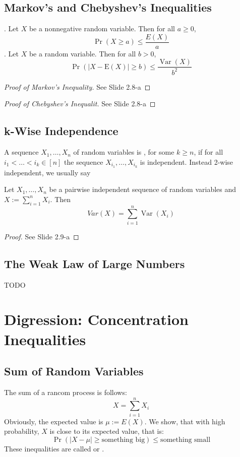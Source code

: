 \subsection{Markov's and Chebyshev's Inequalities}
. Let $X$ be a nonnegative random variable. Then for all $a \geq 0$, 
\begin{equation}
\operatorname{Pr}(X \geq a) \leq \frac{E(X)}{a}
\end{equation}
. Let $X$ be a random variable. Then for all $b > 0$,
\begin{equation}
\operatorname{Pr}(|X-\mathrm{E}(X)| \geq b) \leq \frac{\operatorname{Var}(X)}{b^{2}}
\end{equation}
\begin{proof}[Proof of Markov's Inequality]
	See Slide 2.8-a
\end{proof}
\begin{proof}[Proof of Chebyshev's Inequalit]
	See Slide 2.8-a
\end{proof}
\subsection{k-Wise Independence}
A sequence $X_1,\ldots,X_n$ of random variables is , for some $k \geq n$, if for all $i_1 < \ldots < i_k \in [n]$ the sequence $X_{i_1},\ldots,X_{i_k}$ is independent. Instead 2-wise independent, we usually say 

Let $X_1,\ldots,X_n$ be a pairwise independent sequence of random variables and $X := \sum_{i=1}^{n}X_i$. Then 
\begin{equation}
Var(X) = \sum_{i=1}^n \operatorname{Var}(X_i)
\end{equation}

\begin{proof}
	See Slide 2.9-a
\end{proof}
\subsection{The Weak Law of Large Numbers}
TODO
\section{Digression: Concentration Inequalities}
\subsection{Sum of Random Variables}
The sum of a rancom process is follows:
\begin{equation*}
X = \sum_{i=1}^{n}X_i
\end{equation*}
Obviously, the expected value is $\mu := E(X)$. We show, that with high probability, $X$ is close to its expected value, that is: 
\begin{equation*}
\operatorname{Pr}(|X - \mu| \geq \text{something big} ) \leq \text{something small}
\end{equation*}
These inequalities are called  or .
